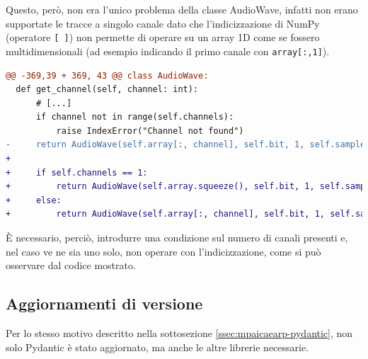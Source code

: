 Questo, però, non era l'unico problema della classe AudioWave, infatti non erano supportate le tracce a singolo canale dato che l'indicizzazione di NumPy (operatore \texttt{[ ]}) non permette di operare su un array 1D come se fossero multidimensionali (ad esempio indicando il primo canale con \texttt{array[:,1]}).
\begin{lstlisting}[language=diff]
@@ -369,39 + 369, 43 @@ class AudioWave:
  def get_channel(self, channel: int):
      # [...]
      if channel not in range(self.channels):
          raise IndexError("Channel not found")
-     return AudioWave(self.array[:, channel], self.bit, 1, self.samplerate)
+  
+     if self.channels == 1:
+         return AudioWave(self.array.squeeze(), self.bit, 1, self.samplerate)
+     else:
+         return AudioWave(self.array[:, channel], self.bit, 1, self.samplerate)
\end{lstlisting}
È necessario, perciò, introdurre una condizione sul numero di canali presenti e, nel caso ve ne sia uno solo, non operare con l'indicizzazione, come si può osservare dal codice mostrato.


\subsection{Aggiornamenti di versione} \label{ssec:mpaicaearp-aggiornamenti}
Per lo stesso motivo descritto nella sottosezione \ref{ssec:mpaicaearp-pydantic}, non solo Pydantic è stato aggiornato, ma anche le altre librerie necessarie.

